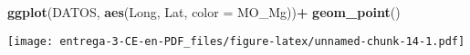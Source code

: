 \documentclass[
]{article}
\newenvironment{Shaded}{\begin{snugshade}}{\end{snugshade}}
\newcommand{\DataTypeTok}[1]{\textcolor[rgb]{0.13,0.29,0.53}{#1}}
\newcommand{\DecValTok}[1]{\textcolor[rgb]{0.00,0.00,0.81}{#1}}
\newcommand{\KeywordTok}[1]{\textcolor[rgb]{0.13,0.29,0.53}{\textbf{#1}}}
\newcommand{\NormalTok}[1]{#1}
\newcommand{\OperatorTok}[1]{\textcolor[rgb]{0.81,0.36,0.00}{\textbf{#1}}}
\newcommand{\StringTok}[1]{\textcolor[rgb]{0.31,0.60,0.02}{#1}}
\begin{document}
\begin{Shaded}
\begin{Highlighting}[]
\KeywordTok{ggplot}\NormalTok{(DATOS, }\KeywordTok{aes}\NormalTok{(Long, Lat, }\DataTypeTok{color =}\NormalTok{ MO_Mg))}\OperatorTok{+}
\StringTok{  }\KeywordTok{geom_point}\NormalTok{()}
\end{Highlighting}
\end{Shaded}

\texttt{[image: entrega-3-CE-en-PDF\_files/figure-latex/unnamed-chunk-14-1.pdf]}

\begin{Shaded}
\end{Shaded}
\end{document}
